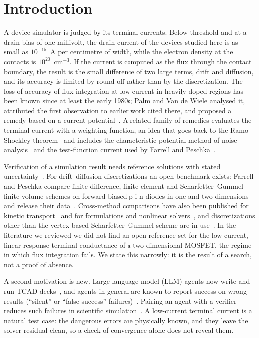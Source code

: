 \documentclass[11pt]{article}
\begin{document}
\section{Introduction}

A device simulator is judged by its terminal currents. Below threshold and at a drain bias of one millivolt, the drain current of the
devices studied here is as small as $10^{-15}$~A per centimetre of width, while the electron density at the contacts is
$10^{20}$~cm$^{-3}$. If the current is computed as the flux through the contact boundary, the result is the small
difference of two large terms, drift and diffusion, and its accuracy is limited by round-off rather than by the
discretization. The loss of accuracy of flux integration at low current in heavily doped regions has been known since
at least the early 1980s; Palm and Van de Wiele analysed it, attributed the first observation to earlier work cited there, and
proposed a remedy based on a current potential~\cite{PalmVandeWiele1985}. A related family of remedies evaluates the
terminal current with a weighting function, an idea that goes back to the Ramo--Shockley theorem~\cite{Shockley1938,Ramo1939}
and includes the characteristic-potential method of noise analysis~\cite{Nah2003} and the test-function current used by
Farrell and Peschka~\cite{FarrellPeschka2019}.

Verification of a simulation result needs reference solutions with stated uncertainty~\cite{OberkampfRoy2010,Roy2005}.
For drift--diffusion discretizations an open benchmark exists: Farrell and Peschka compare finite-difference,
finite-element and Scharfetter--Gummel finite-volume schemes on forward-biased p-i-n diodes in one and two dimensions
and release their data~\cite{FarrellPeschka2019}. Cross-method comparisons have also been published for kinetic
transport~\cite{Carrillo2006} and for formulations and nonlinear solvers~\cite{PerezEscudero2025}, and discretizations
other than the vertex-based Scharfetter--Gummel scheme are in use~\cite{Rupp2014}. In the literature we reviewed we did
not find an open reference set for the low-current, linear-response terminal conductance of a two-dimensional MOSFET,
the regime in which flux integration fails. We state this narrowly: it is the result of a search, not a proof of
absence.

A second motivation is new. Large language model (LLM) agents now write and run TCAD decks~\cite{Fan2025AgenticTCAD,Wang2026TcadGPT},
and agents in general are known to report success on wrong results (``silent'' or ``false success'' failures)~\cite{Mehta2026,Advani2026}.
Pairing an agent with a verifier reduces such failures in scientific simulation~\cite{Yang2026Judge,Deng2026PhysVEC}.
A low-current terminal current is a natural test case: the dangerous errors are physically known, and they leave the
solver residual clean, so a check of convergence alone does not reveal them.
\end{document}
